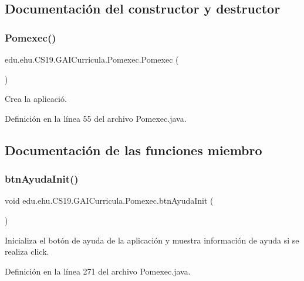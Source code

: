 \subsection{Documentación del constructor y destructor}
\mbox{\label{a00029_a8de2bd06d0893d4f24ef2bd8216467cf}} 
\subsubsection{\texorpdfstring{Pomexec()}{Pomexec()}}
{\footnotesize\ttfamily edu.\+ehu.\+C\+S19.\+G\+A\+I\+Curricula.\+Pomexec.\+Pomexec (\begin{DoxyParamCaption}{ }\end{DoxyParamCaption})}



Crea la aplicació. 



Definición en la línea 55 del archivo Pomexec.\+java.



\subsection{Documentación de las funciones miembro}
\mbox{\label{a00029_a0b62d43fe793951471585f524b8963f0}} 
\subsubsection{\texorpdfstring{btnAyudaInit()}{btnAyudaInit()}}
{\footnotesize\ttfamily void edu.\+ehu.\+C\+S19.\+G\+A\+I\+Curricula.\+Pomexec.\+btn\+Ayuda\+Init (\begin{DoxyParamCaption}{ }\end{DoxyParamCaption})}



Inicializa el botón de ayuda de la aplicación y muestra información de ayuda si se realiza click. 



Definición en la línea 271 del archivo Pomexec.\+java.

